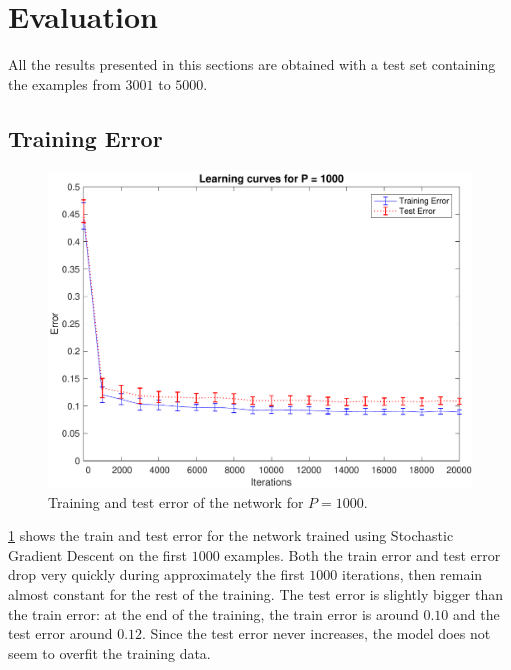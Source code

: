 \section{Evaluation}
\label{sec:evaluation}

All the results presented in this sections are obtained with a test set containing the examples from $3001$ to $5000$.

\subsection{Training Error}
\begin{figure}[t]
	\centering
	\includegraphics[width=\columnwidth]{figures/error}
    \caption{Training and test error of the network for $P = 1000$.}
	\label{fig:training_error}
\end{figure}

\cref{fig:training_error} shows the train and test error for the network trained using Stochastic Gradient Descent on the first $1000$ examples.
Both the train error and test error drop very quickly during approximately the first $1000$ iterations, then remain almost constant for the rest of the training.
The test error is slightly bigger than the train error:
at the end of the training, the train error is around $0.10$ and the test error around $0.12$.
Since the test error never increases, the model does not seem to overfit the training data.

